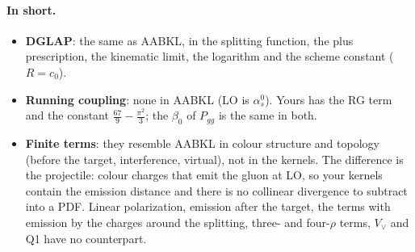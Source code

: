 \documentclass[9pt]{article}
\numberwithin{equation}{section}
\begin{document}
\paragraph{In short.}
\begin{itemize}
\item \textbf{DGLAP}: the same as AABKL, in the splitting function, the plus prescription, the kinematic limit, the logarithm and the scheme constant ($R=c_0$).
\item \textbf{Running coupling}: none in AABKL (LO is $\alpha_s^0$). Yours has the RG term and the constant $\frac{67}{9}-\frac{\pi^2}{3}$; the $\beta_0$ of $P_{gg}$ is the same in both.
\item \textbf{Finite terms}: they resemble AABKL in colour structure and topology (before the target, interference, virtual), not in the kernels. The difference is the projectile: colour charges that emit the gluon at LO, so your kernels contain the emission distance and there is no collinear divergence to subtract into a PDF. Linear polarization, emission after the target, the terms with emission by the charges around the splitting, three- and four-$\rho$ terms, $V_\vee$ and Q1 have no counterpart.
\end{itemize}
\end{document}
